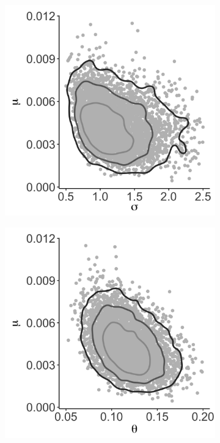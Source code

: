 \documentclass{uwstat572}
\begin{document}
\begin{figure}[H]
\begin{subfigure}[b]{0.3\textwidth}
		\caption{}
		\label{fig:sigma_density}
	\end{subfigure} 
	\medskip
		\begin{subfigure}[b]{0.3\textwidth}
		\includegraphics[width=\textwidth]{figures/figure_2d.png}
		\caption{}
		\label{fig:muSigma}
	\end{subfigure}
	\hfill
	\begin{subfigure}[b]{0.3\textwidth}
		\includegraphics[width=\textwidth]{figures/figure_2e.png}

\end{subfigure}
\end{figure}
\end{document}
